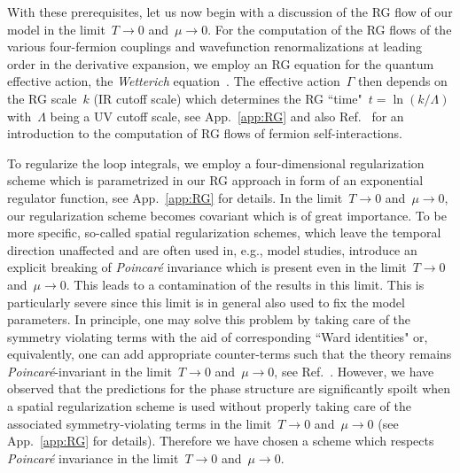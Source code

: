 \documentclass[prd,english,preprintnumbers,amsmath,amssymb,nofootinbib,twocolumn,superscriptaddress]{revtex4-1}
\begin{document}
{{With these prerequisites, 
let} us now begin with a discussion of the RG flow of our model in the limit~$T\to 0$ and~$\mu\to 0$.
For the computation of the RG flows of the various four-fermion couplings and wavefunction renormalizations at leading order 
in the derivative expansion, we employ an RG equation for the quantum effective action, the {\it Wetterich} equation~\cite{Wetterich:1992yh}. 
The effective action~$\Gamma$ then depends on the RG scale~$k$ (IR cutoff scale) which determines {the RG ``time"~$t=\ln(k/\Lambda)$}
with~$\Lambda$ being a UV cutoff scale, see App.~\ref{app:RG} and also 
Ref.~\cite{Braun:2011pp} for an introduction to the computation
of RG flows of fermion self-interactions. 

To regularize the loop integrals, we {employ a four-dimensional regularization} 
scheme which is parametrized in our RG approach in form of an exponential
regulator function, see App.~\ref{app:RG} for details. In 
the limit~$T\to 0$ and~$\mu\to 0$, our regularization scheme becomes covariant which is of
great importance. 
To be more specific, so-called spatial regularization schemes, which leave the temporal direction unaffected and
are often used in, e.g., model studies, introduce an explicit breaking of {\it Poincar\'{e}} invariance which is present 
even in the limit~$T\to 0$ and~$\mu\to 0$. This leads to a contamination of the results in this limit. 
This is particularly severe since this 
limit is in general also 
used to fix the model parameters. In principle, one may solve this problem by taking care of the symmetry violating terms with the aid of
corresponding ``Ward identities" or, equivalently, one can add appropriate counter-terms such that the theory remains
{\it Poincar\'{e}}-invariant in the limit~$T\to 0$ and~$\mu\to 0$, see Ref.~\cite{Braun:2009si}. However, 
we have observed that
the predictions for the phase structure are significantly spoilt when a spatial regularization scheme is used without properly
taking care of the associated symmetry-violating terms in the limit~$T\to 0$ and~$\mu\to 0$ (see App.~\ref{app:RG} for details). Therefore we 
have chosen a scheme which respects {\it Poincar\'{e}} invariance in the limit~$T\to 0$ and~$\mu\to 0$. 

}
\end{document}
